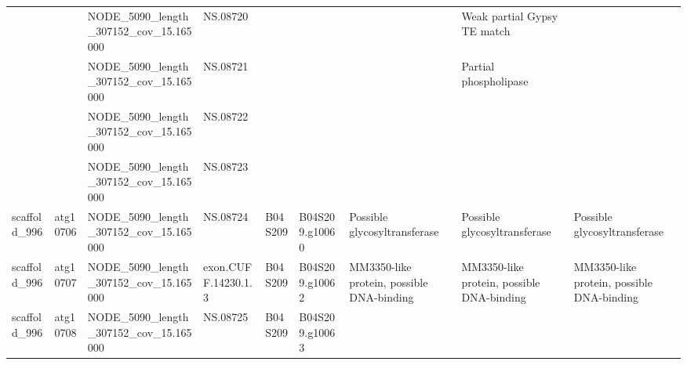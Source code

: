 \begin{longtable}{lllllllll}
                &           &   NODE\_5090\_length\_307152\_cov\_15.165000 &              NS.08720 &              &                 &                                                                                 &                                                     Weak partial Gypsy TE match &                                                                                 \\
                &           &   NODE\_5090\_length\_307152\_cov\_15.165000 &              NS.08721 &              &                 &                                                                                 &                                                           Partial phospholipase &                                                                                 \\
                &           &   NODE\_5090\_length\_307152\_cov\_15.165000 &              NS.08722 &              &                 &                                                                                 &                                                                                 &                                                                                 \\
                &           &   NODE\_5090\_length\_307152\_cov\_15.165000 &              NS.08723 &              &                 &                                                                                 &                                                                                 &                                                                                 \\
   scaffold\_996 &  atg10706 &   NODE\_5090\_length\_307152\_cov\_15.165000 &              NS.08724 &      B04S209 &  B04S209.g10060 &                                                    Possible glycosyltransferase &                                                    Possible glycosyltransferase &                                                    Possible glycosyltransferase \\
   scaffold\_996 &  atg10707 &   NODE\_5090\_length\_307152\_cov\_15.165000 &   exon.CUFF.14230.1.3 &      B04S209 &  B04S209.g10062 &                                       MM3350-like protein, possible DNA-binding &                                       MM3350-like protein, possible DNA-binding &                                       MM3350-like protein, possible DNA-binding \\
   scaffold\_996 &  atg10708 &   NODE\_5090\_length\_307152\_cov\_15.165000 &              NS.08725 &      B04S209 &  B04S209.g10063 &                                                                                 &                                                                                 &                                                                                 \\

\end{longtable}
